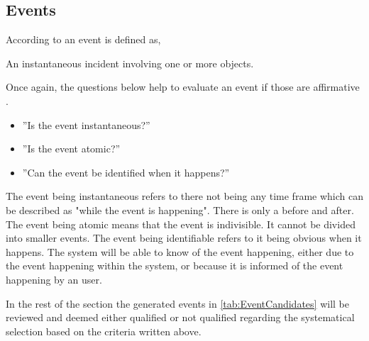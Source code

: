 \subsection{Events} \label{sec:Events}
According to \citep[p.~53]{Rod-Aalborg} an event is defined as,
\begin{defn}\label{defn:Event}
An instantaneous incident involving one or more objects.
\end{defn}

Once again, the questions below help to evaluate an event if those are affirmative \citep[p.~65]{Rod-Aalborg}.
\begin{itemize}
	\item ''Is the event instantaneous?''
	\item ''Is the event atomic?''
	\item ''Can the event be identified when it happens?''
\end{itemize}

The event being instantaneous refers to there not being any time frame which can be described as "while the event is happening".
There is only a before and after.
The event being atomic means that the event is indivisible.
It cannot be divided into smaller events.
The event being identifiable refers to it being obvious when it happens. The system will be able to know of the event happening, either due to the event happening within the system, or because it is informed of the event happening by an user.

In the rest of the section the generated events in \cref{tab:EventCandidates} will be reviewed and deemed either qualified or not qualified regarding the systematical selection based on the criteria written above.

